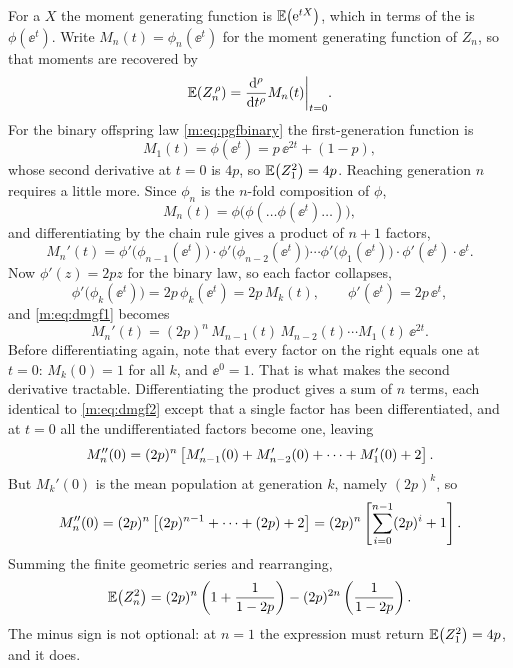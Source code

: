 For a \rv{} $X$ the moment generating function is $\mathbb{E}\!\left(\mathrm{e}^{tX}\right)$, which in
terms of the \pgf{} is $\phi(\ee^t)$. Write $M_n(t) = \phi_n(\ee^t)$ for the
moment generating function of $Z_n$, so that moments are recovered by
\begin{equation}
\label{m:eq:mgfmoments}
\mathbb{E}\!\left(Z_n^{\,\rho}\right) = \frac{\mathrm{d} ^{\rho}}{\mathrm{d} t^{\rho}}M_n(t)\bigg|_{t=0} .
\end{equation}
For the binary offspring law \cref{m:eq:pgfbinary} the first-generation function
is
\begin{equation}
\label{m:eq:mgf1}
M_1(t) = \phi(\ee^t) = p\,\ee^{2t} + (1-p),
\end{equation}
whose second derivative at $t=0$ is $4p$, so $\mathbb{E}\!\left(Z_1^2\right)=4p$. Reaching
generation $n$ requires a little more. Since $\phi_n$ is the $n$-fold
composition of $\phi$,
\begin{equation*}
M_n(t) = \phi\bigl(\phi(\dots\phi(\ee^t)\dots)\bigr),
\end{equation*}
and differentiating by the chain rule gives a product of $n+1$ factors,
\begin{equation}
\label{m:eq:dmgf1}
M_n'(t) = \phi'\bigl(\phi_{n-1}(\ee^t)\bigr)\cdot\phi'\bigl(\phi_{n-2}(\ee^t)\bigr)
\cdots\phi'\bigl(\phi_1(\ee^t)\bigr)\cdot\phi'(\ee^t)\cdot\ee^t .
\end{equation}
Now $\phi'(z) = 2pz$ for the binary law, so each factor collapses,
\begin{equation*}
\phi'\bigl(\phi_k(\ee^t)\bigr) = 2p\,\phi_k(\ee^t) = 2p\,M_k(t),
\qquad
\phi'(\ee^t) = 2p\,\ee^t ,
\end{equation*}
and \cref{m:eq:dmgf1} becomes
\begin{equation}
\label{m:eq:dmgf2}
M_n'(t) = (2p)^n\,M_{n-1}(t)\,M_{n-2}(t)\cdots M_1(t)\,\ee^{2t} .
\end{equation}
Before differentiating again, note that every factor on the right equals one at
$t=0$: $M_k(0)=1$ for all $k$, and $\ee^0=1$. That is what makes the second
derivative tractable. Differentiating the product gives a sum of $n$ terms, each
identical to \cref{m:eq:dmgf2} except that a single factor has been
differentiated, and at $t=0$ all the undifferentiated factors become one,
leaving
\begin{equation*}
M_n''(0) = (2p)^n\left[M_{n-1}'(0) + M_{n-2}'(0) + \cdots + M_1'(0) + 2\right].
\end{equation*}
But $M_k'(0)$ is the mean population at generation $k$, namely $(2p)^k$, so
\begin{equation*}
M_n''(0) = (2p)^n\left[(2p)^{n-1} + \cdots + (2p) + 2\right]
= (2p)^n\left[\sum_{i=0}^{n-1}(2p)^i + 1\right].
\end{equation*}
Summing the finite geometric series and rearranging,
\begin{equation}
\label{m:eq:secondMoment}
\mathbb{E}\!\left(Z_n^2\right) = (2p)^n\left(1+\frac{1}{1-2p}\right) - (2p)^{2n}\left(\frac{1}{1-2p}\right) .
\end{equation}
The minus sign is not optional: at $n=1$ the expression must return
$\mathbb{E}\!\left(Z_1^2\right)=4p$, and it does.


